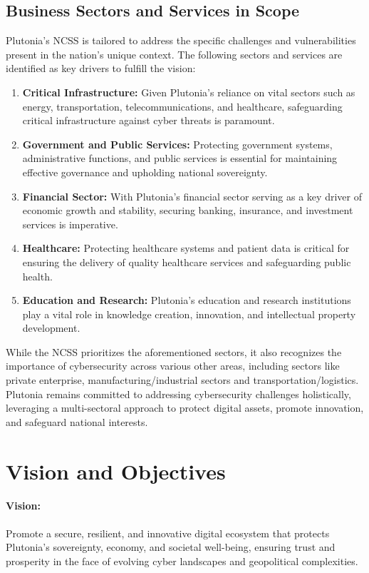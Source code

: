 \documentclass[
	a4paper, %
	10pt, %
]{CSSullivanBusinessReport}
\begin{document}
\begin{fullwidth}
\begin{justify}
\subsection{Business Sectors and Services in Scope}
Plutonia's NCSS is tailored to address the specific challenges and vulnerabilities present in the nation's unique context. The following sectors and services are identified as key drivers to fulfill the vision:
\begin{enumerate}
	\item \textbf{Critical Infrastructure:} Given Plutonia's reliance on vital sectors such as energy, transportation, telecommunications, and healthcare, safeguarding critical infrastructure against cyber threats is paramount.
	\item \textbf{Government and Public Services:} Protecting government systems, administrative functions, and public services is essential for maintaining effective governance and upholding national sovereignty.
	\item \textbf{Financial Sector:} With Plutonia's financial sector serving as a key driver of economic growth and stability, securing banking, insurance, and investment services is imperative.
	\item \textbf{Healthcare:} Protecting healthcare systems and patient data is critical for ensuring the delivery of quality healthcare services and safeguarding public health.
	\item \textbf{Education and Research:} Plutonia's education and research institutions play a vital role in knowledge creation, innovation, and intellectual property development.
\end{enumerate}
While the NCSS prioritizes the aforementioned sectors, it also recognizes the importance of cybersecurity across various other areas, including sectors like private enterprise, manufacturing/industrial sectors and transportation/logistics. Plutonia remains committed to addressing cybersecurity challenges holistically, leveraging a multi-sectoral approach to protect digital assets, promote innovation, and safeguard national interests.

\section{Vision and Objectives}
\paragraph{Vision:} Promote a secure, resilient, and innovative digital ecosystem that protects Plutonia's sovereignty, economy, and societal well-being, ensuring trust and prosperity in the face of evolving cyber landscapes and geopolitical complexities.

\end{justify}
\end{fullwidth}
\end{document}
